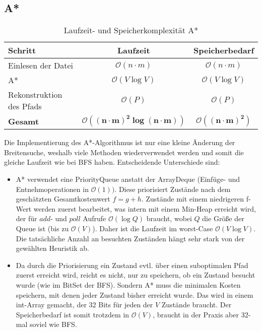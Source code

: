 \documentclass[a4paper,10pt,ngerman]{scrartcl}
\begin{document}
\subsection{A*}

\vspace{0.2cm}
\begin{table}[H]
\centering
\begin{tabular}{|l|c|c|}
\hline
\textbf{Schritt} & \textbf{Laufzeit} & \textbf{Speicherbedarf} \\
\hline
Einlesen der Datei & $\mathcal{O}(n\cdot m)$ & $\mathcal{O}(n\cdot m)$ \\
A* & $\mathcal{O}(V \log V)$ & $\mathcal{O}(V \log V)$ \\
Rekonstruktion des Pfads & $\mathcal{O}(P)$ & $\mathcal{O}(P)$ \\
\hline
\textbf{Gesamt} & $\boldsymbol{\mathcal{O}((n\cdot m)^2 \log (n \cdot m))}$ & $\boldsymbol{\mathcal{O}((n\cdot m)^2)}$ \\
\hline
\end{tabular}
\caption{Laufzeit- und Speicherkomplexität A*}
\end{table}
Die Implementierung des A*-Algorithmus ist nur eine kleine Änderung der Breitensuche, weshalb viele Methoden wiederverwendet werden und somit die gleiche Laufzeit wie bei BFS haben. 
Entscheidende Unterschiede sind:
\begin{itemize}
    \item A* verwendet eine PriorityQueue anstatt der ArrayDeque (Einfüge- und Entnehmoperationen in $\mathcal{O}(1))$. Diese priorisiert Zustände nach dem geschätzten Gesamtkostenwert $f = g + h$. Zustände mit einem niedrigeren f-Wert werden zuerst bearbeitet, was intern mit einem Min-Heap erreicht wird, der für $add$- und $poll$ Aufrufe $\mathcal{O}(\log Q)$ braucht, wobei $Q$ die Größe der Queue ist (bis zu $\mathcal{O}(V)$). Daher ist die Laufzeit im worst-Case $\mathcal{O}(V \log V)$. Die tatsächliche Anzahl an besuchten Zuständen hängt sehr stark von der gewählten Heuristik ab.
    \item Da durch die Priorisierung ein Zustand evtl. über einen suboptimalen Pfad zuerst erreicht wird, reicht es nicht, nur zu speichern, ob ein Zustand besucht wurde (wie im BitSet der BFS). Sondern A* muss die minimalen Kosten speichern, mit denen jeder Zustand bisher erreicht wurde. Das wird in einem int-Array gemacht, der 32 Bits für jeden der $V$ Zustände braucht. Der Speicherbedarf ist somit trotzdem in $\mathcal{O}(V)$, braucht in der Praxis aber 32-mal soviel wie BFS.
\end{itemize}
    
\end{document}
